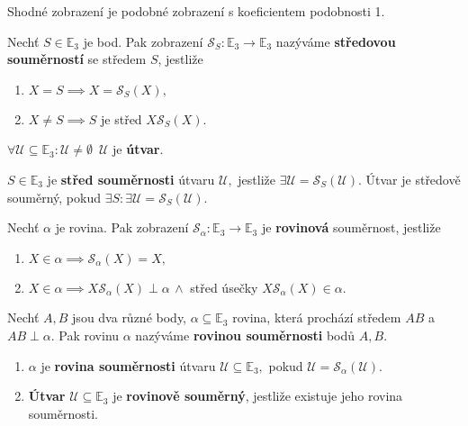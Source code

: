 \begin{pozn}
    Shodné zobrazení je podobné zobrazení s koeficientem podobnosti 1.
\end{pozn}

\begin{definition}
    Nechť $S\in \mathbb E_3$ je bod. Pak zobrazení $\mathscr S_S: \mathbb E_3 \to
    \mathbb E_3$ nazýváme \textbf{středovou souměrností} se středem $S$, jestliže
    \begin{enumerate}[$i.$]
    \item $X=S\implies X=\mathscr S_S(X),$
   	\item $X\ne S \implies S$ je střed $X\mathscr S_S(X).$
    \end{enumerate}
\end{definition}

\begin{definition}
    $\forall \mathscr U \subseteq \mathbb E_3: \mathscr U\ne \emptyset \,\,\, \mathscr
    U$ je \textbf{útvar}.
\end{definition}

\begin{definition}
    $S\in \mathbb E_3$ je \textbf{střed souměrnosti} útvaru $\mathscr U,$ jestliže
    $\exists \mathscr U = \mathscr S_S(\mathscr U).$ Útvar je středově souměrný,
    pokud $\exists S:\exists\mathscr U = \mathscr S_S(\mathscr U).$
\end{definition}

\begin{definition}
    Nechť $\alpha$ je rovina. Pak zobrazení $\mathscr S_\alpha:\mathbb E_3 \to
    \mathbb E_3$ je \textbf{rovinová}  souměrnost, jestliže
    \begin{enumerate}[$i.$]
    \item $X\in\alpha\implies \mathscr S_\alpha(X)=X,$
   	\item $X\in\alpha\implies X\mathscr S_\alpha(X) \perp\alpha\,\land$ střed úsečky
    $X\mathscr S_\alpha(X)\in \alpha.$
    \end{enumerate}
\end{definition}

\begin{definition}
    Nechť $A,B$ jsou dva různé body, $\alpha \subseteq \mathbb E_3$ rovina, která
    prochází středem $AB$ a $AB\perp \alpha$. Pak rovinu $\alpha$ nazýváme
    \textbf{rovinou souměrnosti} bodů $A,B.$
\end{definition}

\begin{definition}
\begin{enumerate}[$i.$]
\item $\alpha$ je \textbf{rovina souměrnosti} útvaru $\mathscr U\subseteq \mathbb E_3,$
pokud $\mathscr U = \mathscr S_\alpha(\mathscr U).$
\item \textbf{Útvar} $\mathscr U \subseteq \mathbb E_3$ je \textbf{rovinově souměrný},
jestliže existuje jeho rovina souměrnosti.
\end{enumerate}
\end{definition}

